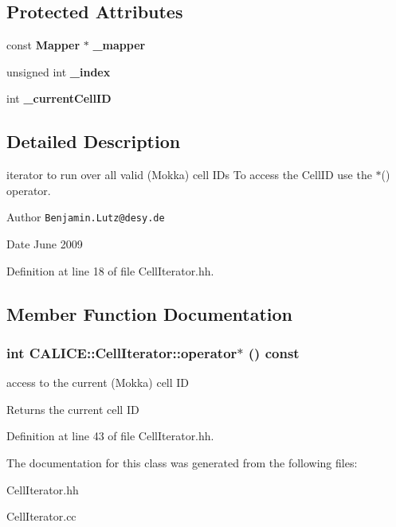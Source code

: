\subsection*{Protected Attributes}
\begin{DoxyCompactItemize}
\item 
const {\bf Mapper} $\ast$ {\bfseries \_\-mapper}\label{classCALICE_1_1CellIterator_ac61b53457ed96438d6a3c20658a8b470}

\item 
unsigned int {\bfseries \_\-index}\label{classCALICE_1_1CellIterator_a3ec4eb2ac9ee642f134773d08b382281}

\item 
int {\bfseries \_\-currentCellID}\label{classCALICE_1_1CellIterator_ae8e06dc84e48a482fd2f6ee28d5833eb}

\end{DoxyCompactItemize}


\subsection{Detailed Description}
iterator to run over all valid (Mokka) cell IDs To access the CellID use the $\ast$() operator.

\begin{DoxyAuthor}{Author}
{\tt Benjamin.Lutz@desy.de} 
\end{DoxyAuthor}
\begin{DoxyDate}{Date}
June 2009 
\end{DoxyDate}


Definition at line 18 of file CellIterator.hh.

\subsection{Member Function Documentation}
\subsubsection[{operator$\ast$}]{\setlength{\rightskip}{0pt plus 5cm}int CALICE::CellIterator::operator$\ast$ () const\hspace{0.3cm}{\ttfamily  [inline]}}\label{classCALICE_1_1CellIterator_ad5a74f9ea744a9ccac7f40a549ddd4cf}


access to the current (Mokka) cell ID \begin{DoxyReturn}{Returns}
the current cell ID 
\end{DoxyReturn}


Definition at line 43 of file CellIterator.hh.

The documentation for this class was generated from the following files:\begin{DoxyCompactItemize}
\item 
CellIterator.hh\item 
CellIterator.cc\end{DoxyCompactItemize}
